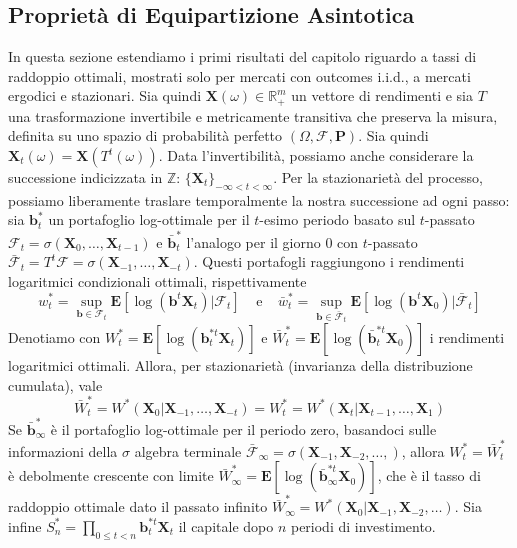 \documentclass[a4paper,11pt]{book}
\theoremstyle{plain}
\theoremstyle{definition}
\theoremstyle{remark}
\newcommand{\R}{\mathbb{R}}
\newcommand{\Z}{\mathbb{Z}}
\newcommand{\X}{\bm{X}}
\newcommand{\B}{\bm{b}}
\newcommand{\F}{\mathcal{F}}
\newcommand{\Pro}{\mathbf{P}}
\newcommand{\E}{\mathbf{E}}
\begin{document}
\subsection{Proprietà di Equipartizione Asintotica}
In questa sezione estendiamo i primi risultati del capitolo riguardo a tassi di raddoppio ottimali, mostrati solo per mercati con outcomes i.i.d., a mercati ergodici e stazionari.\newline
Sia quindi $\X(\omega)\in \R_+^m$ un vettore di rendimenti e sia $T$ una trasformazione invertibile e metricamente transitiva che preserva la misura, definita su uno spazio di probabilità perfetto $(\Omega, \F, \Pro)$. Sia quindi $\X_t(\omega) = \X(T^t(\omega))$. Data l'invertibilità, possiamo anche considerare la successione indicizzata in $\Z$: $\{\X_t\}_{-\infty<t<\infty}$.\newline
Per la stazionarietà del processo, possiamo liberamente traslare temporalmente la nostra successione ad ogni passo: sia $\B_t^*$ un portafoglio log-ottimale per il $t$-esimo periodo basato sul $t$-passato $\F_t=\sigma(\X_0,\ldots,\X_{t-1})$ e $\bar{\B}_t^*$ l'analogo per il giorno $0$ con $t$-passato $\bar{\F}_t=T^t\F= \sigma(\X_{-1},\ldots,\X_{-t})$. Questi portafogli raggiungono i rendimenti logaritmici condizionali ottimali, rispettivamente
\begin{equation*}
 w_t^*=\sup\limits_{\B\in \F_t}\E[\log(\B^t\X_t)|\F_t]\;\;\;\; \text{e} \;\;\;\; \bar{w}_t^* =\sup\limits_{\B\in \bar{\F}_t}\E[\log(\B^t\X_0)|\bar{\F}_t]
\end{equation*}
Denotiamo con $W_t^*=\E[\log(\B_t^{*t}\X_t)]$ e $\bar{W}_t^{*}=\E[\log(\bar{\B}_t^{*t}\X_0)]$ i rendimenti logaritmici ottimali. Allora, per stazionarietà (invarianza della distribuzione cumulata), vale
\begin{equation*}
 \bar{W}_t^{*}=W^*(\X_0|\X_{-1},\ldots, \X_{-t}) = W^*_t = W^*(\X_t|\X_{t-1},\ldots, \X_1)
\end{equation*} 
Se $\bar{\B}_{\infty}^*$ è il portafoglio log-ottimale per il periodo zero, basandoci sulle informazioni della $\sigma$ algebra terminale $\bar{\F}_\infty=\sigma(\X_{-1},\X_{-2},\ldots,)$, allora $W^*_t=\bar{W}_t^*$ è debolmente crescente con limite $\bar{W}_\infty^*=\E[\log(\bar{\B}_\infty^{*t}\X_0)]$, che è il tasso di raddoppio ottimale dato il passato infinito $\bar{W}_\infty^{*}=W^*(\X_0|\X_{-1},\X_{-2},\ldots)$.\newline
Sia infine $S_n^*=\prod_{0\leq t <n}{\B_t^{*t}\X_t}$ il capitale dopo $n$ periodi di investimento.
\end{document}
